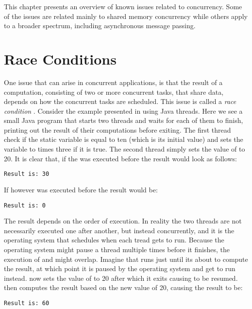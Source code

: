 \makeatletter {}\makeatother
{}
This chapter presents an overview of known issues related to concurrency. Some of the issues are related mainly to shared memory concurrency while others apply to a broader spectrum, including asynchronous message passing.
\section{Race Conditions}
One issue that can arise in concurrent applications, is that the result of a computation, consisting of two or more concurrent tasks, that share data, depends on how the concurrent tasks are scheduled. This issue is called a \emph{race condition}
\cite[p. 983]{bryant2011computer}\cite[p. 115]{tanenbaum2008modern}. Consider the example presented in  using Java threads. Here we see a small Java program that starts two threads and waits for each of them to finish, printing out the result of their computations before exiting. The first thread check if the static variable  is equal to ten (which is its initial value) and sets the  variable to  times three if it is true. The second thread simply sets the value of  to 20. It is clear that, if the  was executed before  the result would look as follows:
\begin{verbatim}
Result is: 30
\end{verbatim}
If however  was executed before  the result would be:
\begin{verbatim}
Result is: 0
\end{verbatim}
The result depends on the order of execution. In reality the two threads are not necessarily executed one after another, but instead concurrently, and it is the operating system that schedules when each tread gets to run. Because the operating system might pause a thread multiple times before it finishes, the execution of  and  might overlap. Imagine that  runs just until its about to compute the result, at which point it is paused by the operating system and  get to run instead.  now sets the value of  to 20 after which it exits causing  to be resumed.  then computes the result based on the new  value of 20, causing the result to be:
\begin{verbatim}
Result is: 60
\end{verbatim}
